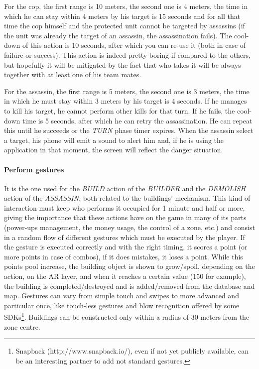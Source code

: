 {				
				For the cop, the first range is 10 meters, the second one is 4 meters, the time in which he can stay within 4 meters by his target is 15 seconds and for all that time the cop himself and the protected unit cannot be targeted by assassins (if the unit was already the target of an assassin, the assassination fails). The cool-down of this action is 10 seconds, after which you can re-use it (both in case of failure or success).
				This action is indeed pretty boring if compared to the others, but hopefully it will be mitigated by the fact that who takes it will be always together with at least one of his team mates.
				
				
				For the assassin, the first range is 5 meters, the second one is 3 meters, the time in which he must stay within 3 meters by his target is 4 seconds. If he manages to kill his target, he cannot perform other kills for that turn. If he fails, the cool-down time is 5 seconds, after which he can retry the assassination. He can repeat this until he succeeds or the \emph{TURN} phase timer expires.
				When the assassin select a target, his phone will emit a sound to alert him and, if he is using the application in that moment, the screen will reflect the danger situation.
				
				\paragraph{Perform gestures}
				It is the one used for the \emph{BUILD} action of the \emph{BUILDER} and the \emph{DEMOLISH} action of the \emph{ASSASSIN}, both related to the buildings' mechanism.
				This kind of interaction must keep who performs it occupied for 1 minute and half or more, giving the importance that these actions have on the game in many of its parts (power-ups management, the money usage, the control of a zone, etc.) and consist in a random flow of different gestures which must be executed by the player. If the gesture is executed correctly and with the right timing, it scores a point (or more points in case of combos), if it does mistakes, it loses a point. While this points pool increase, the building object is shown to grow/spoil, depending on the action, on the AR layer, and when it reaches a certain value (150 for example), the building is completed/destroyed and is added/removed from the database and map.
				Gestures can vary from simple touch and swipes to more advanced and particular once, like touch-less gestures and blow recognition offered by some SDKs\footnote{Snapback (http://www.snapback.io/), even if not yet publicly available, can be an interesting partner to add not standard gestures.}.
				Buildings can be constructed only within a radius of 30 meters from the zone centre.
				
			}
